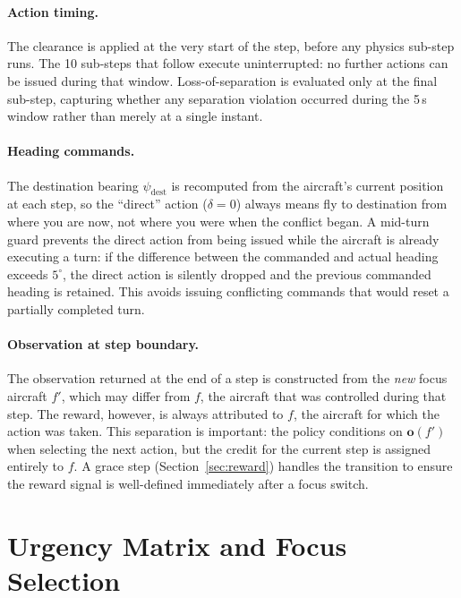 \documentclass[11pt, a4paper]{article}
\begin{document}
\paragraph{Action timing.}
The clearance is applied at the very start of the step, before any physics
sub-step runs.
The 10 sub-steps that follow execute uninterrupted: no further actions can be
issued during that window.
Loss-of-separation is evaluated only at the final sub-step, capturing whether
any separation violation occurred during the 5\,s window rather than merely
at a single instant.

\paragraph{Heading commands.}
The destination bearing $\psi_\text{dest}$ is recomputed from the aircraft's
current position at each step, so the ``direct'' action ($\delta = 0$) always
means fly to destination from where you are now, not where you were when the
conflict began.
A mid-turn guard prevents the direct action from being issued while the
aircraft is already executing a turn: if the difference between the commanded
and actual heading exceeds $5^\circ$, the direct action is silently dropped and
the previous commanded heading is retained.
This avoids issuing conflicting commands that would reset a partially completed
turn.

\paragraph{Observation at step boundary.}
The observation returned at the end of a step is constructed from the
\emph{new} focus aircraft $f'$, which may differ from $f$, the aircraft that
was controlled during that step.
The reward, however, is always attributed to $f$, the aircraft for which the
action was taken.
This separation is important: the policy conditions on $\mathbf{o}(f')$ when
selecting the next action, but the credit for the current step is assigned
entirely to $f$.
A grace step (Section~\ref{sec:reward}) handles the transition to ensure the
reward signal is well-defined immediately after a focus switch.

\section{Urgency Matrix and Focus Selection}
\label{sec:urgency}
\end{document}
